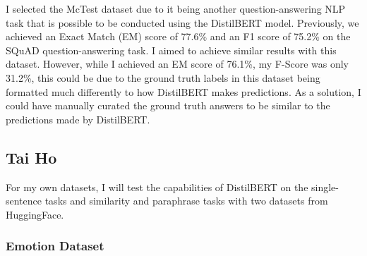 \documentclass[
  11pt,
]{article}
\begin{document}
I selected the McTest dataset due to it being another question-answering
NLP task that is possible to be conducted using the DistilBERT model.
Previously, we achieved an Exact Match (EM) score of 77.6\% and an F1
score of 75.2\% on the SQuAD question-answering task. I aimed to achieve
similar results with this dataset. However, while I achieved an EM score
of 76.1\%, my F-Score was only 31.2\%, this could be due to the ground
truth labels in this dataset being formatted much differently to how
DistilBERT makes predictions. As a solution, I could have manually
curated the ground truth answers to be similar to the predictions made
by DistilBERT.

\subsection{Tai Ho}\label{tai-ho}

For my own datasets, I will test the capabilities of DistilBERT on the
single-sentence tasks and similarity and paraphrase tasks with two
datasets from HuggingFace.

\subsubsection{Emotion Dataset}\label{emotion-dataset}
\end{document}

